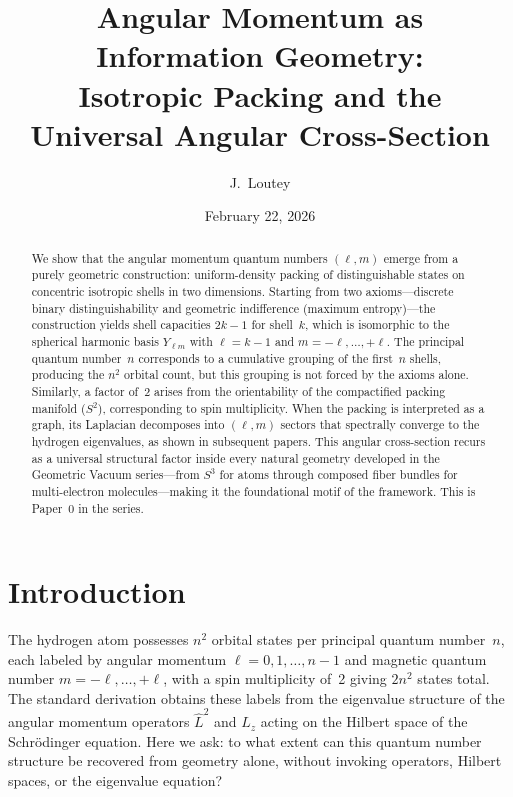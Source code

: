 \documentclass[aps,prl,reprint,amsmath,amssymb]{revtex4-2}
\begin{document}
\title{Angular Momentum as Information Geometry:\\Isotropic Packing and the Universal Angular Cross-Section}

\author{J.~Loutey}

\date{February 22, 2026}

\begin{abstract}
We show that the angular momentum quantum numbers $(\ell, m)$ emerge
from a purely geometric construction: uniform-density packing of
distinguishable states on concentric isotropic shells in two
dimensions.  Starting from two axioms---discrete binary
distinguishability and geometric indifference (maximum entropy)---the
construction yields shell capacities $2k-1$ for shell~$k$, which is
isomorphic to the spherical harmonic basis $Y_{\ell m}$ with
$\ell = k - 1$ and $m = -\ell, \ldots, +\ell$.  The principal quantum
number~$n$ corresponds to a cumulative grouping of the first~$n$
shells, producing the $n^2$ orbital count, but this grouping is not
forced by the axioms alone.  Similarly, a factor of~2 arises from the
orientability of the compactified packing manifold ($S^2$),
corresponding to spin multiplicity.  When the packing is interpreted
as a graph, its Laplacian decomposes into $(\ell, m)$ sectors that
spectrally converge to the hydrogen eigenvalues, as shown in
subsequent papers.  This angular cross-section recurs as a universal
structural factor inside every natural geometry developed in the
Geometric Vacuum series---from $S^3$ for atoms through composed fiber
bundles for multi-electron molecules---making it the foundational
motif of the framework.  This is Paper~0 in the series.
\end{abstract}

\maketitle

\section{Introduction}
\label{sec:introduction}

The hydrogen atom possesses $n^2$ orbital states per principal quantum
number~$n$, each labeled by angular momentum
$\ell = 0, 1, \ldots, n-1$ and magnetic quantum number
$m = -\ell, \ldots, +\ell$, with a spin multiplicity of~2 giving
$2n^2$ states total.  The standard derivation obtains these labels
from the eigenvalue structure of the angular momentum operators
$\hat{L}^2$ and $\hat{L}_z$ acting on the Hilbert space of the
Schr\"odinger equation.  Here we ask: to what extent can this quantum
number structure be recovered from geometry alone, without invoking
operators, Hilbert spaces, or the eigenvalue equation?
\end{document}
